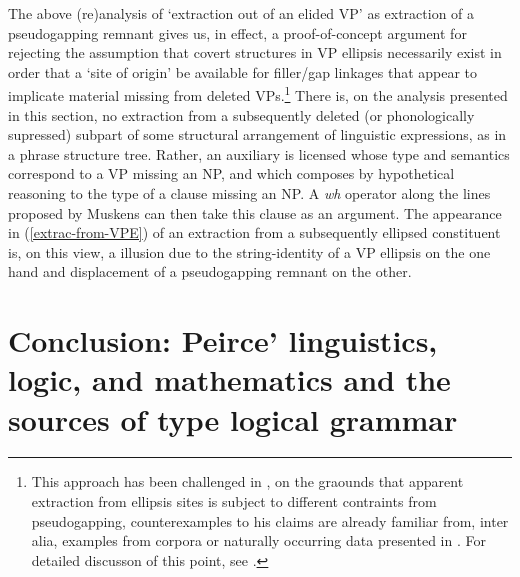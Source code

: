 \documentclass[output=paper,colorlinks,citecolor=brown]{langscibook}
\begin{document}
The above (re)analysis of `extraction out of an elided VP' as
extraction of a pseudogapping remnant gives us, in effect, a
proof-of-concept argument for rejecting the assumption that covert
structures in VP ellipsis necessarily exist in order that a `site of
origin' be available for filler/gap linkages that appear to implicate
material missing from deleted VPs.\footnote{This approach has been
challenged in \citet{johnson2001}, on the graounds that apparent extraction
from ellipsis sites is subject to different contraints from
pseudogapping, counterexamples to his claims are already familiar
from, inter alia, examples from corpora or naturally occurring data
presented in \citet{levin-diss}. For detailed discusson of this point, see
\citet[Section~8.4.2]{kubotalevineBook}.} There is, on the analysis
presented in this section, no extraction from a subsequently deleted
(or phonologically supressed) subpart of some structural arrangement
of linguistic expressions, as in a phrase structure tree. Rather, an
auxiliary is licensed whose type and semantics correspond to a VP
missing an NP, and which composes by hypothetical reasoning to the
type of a clause missing an NP. A \textit{wh} operator along the lines
proposed by Muskens can then take this clause as an argument. The
appearance in (\ref{extrac-from-VPE}) of an extraction from a subsequently
ellipsed constituent is, on this view, a illusion due to the
string-identity of a VP ellipsis on the one hand and displacement of a
pseudogapping remnant on the other.

\section{Conclusion: Peirce' linguistics, logic, and mathematics and the sources of type logical grammar}
\end{document}
